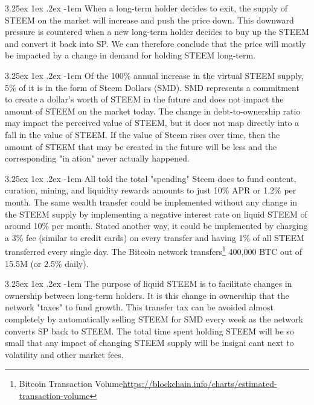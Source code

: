 \documentclass{article}
\makeatletter
\renewcommand\paragraph{\@startsection{paragraph}{5}{\z@}%
  {3.25ex \@plus1ex \@minus.2ex}%
  {-1em}%
  {\normalfont\normalsize\bfseries}}
\makeatother
\begin{document}
			\paragraph{}
				When a long-term holder decides to exit, the supply of STEEM on the market will increase and push the price down. This downward pressure is countered when a new long-term holder decides to buy up the STEEM and convert it back into SP. We can therefore conclude that the price will mostly be impacted by a change in demand for holding STEEM long-term.

			\paragraph{}
				Of the 100\% annual increase in the virtual STEEM supply, 5\% of it is in the form of Steem Dollars (SMD). SMD represents a commitment to create a dollar's worth of STEEM in the future and does not impact the amount of STEEM on the market today. The change in debt-to-ownership ratio may impact the perceived value of STEEM, but it does not map directly into a fall in the value of STEEM. If the value of Steem rises over time, then the amount of STEEM that may be created in the future will be less and the corresponding "in ation" never actually happened.

			\paragraph{}
				All told the total "spending" Steem does to fund content, curation, mining, and liquidity rewards amounts to just 10\% APR or 1.2\% per month. The same wealth transfer could be implemented without any change in the STEEM supply by implementing a negative interest rate on liquid STEEM of around 10\% per month. Stated another way, it could be implemented by charging a 3\% fee (similar to credit cards) on every transfer and having 1\% of all STEEM transferred every single day. The Bitcoin network transfers\footnote{Bitcoin Transaction Volume\newline\url{https://blockchain.info/charts/estimated-transaction-volume}} 400,000 BTC out of 15.5M (or 2.5\% daily).

			\paragraph{}
				The purpose of liquid STEEM is to facilitate changes in ownership between long-term holders. It is this change in ownership that the network "taxes" to fund growth. This transfer tax can be avoided almost completely by automatically selling STEEM for SMD every week as the network converts SP back to STEEM. The total time spent holding STEEM will be so small that any impact of changing STEEM supply will be insigni cant next to volatility and other market fees.
\end{document}
